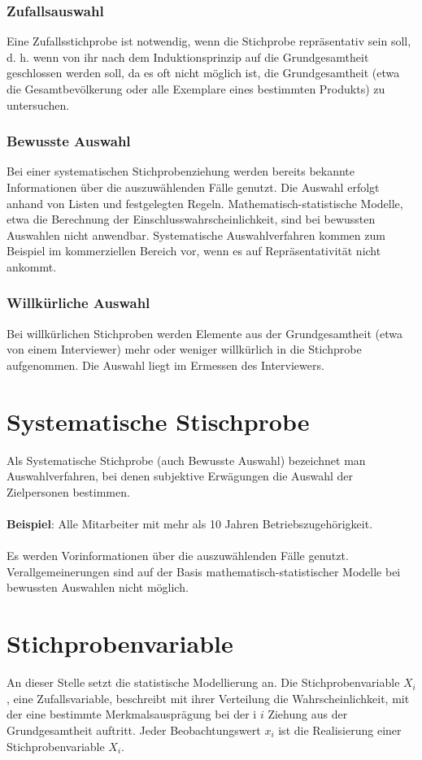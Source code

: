 \subsubsection{Zufallsauswahl}
Eine Zufallsstichprobe ist notwendig, wenn die Stichprobe repräsentativ sein soll, d. h. wenn von ihr nach dem Induktionsprinzip auf die Grundgesamtheit geschlossen werden soll, da es oft nicht möglich ist, die Grundgesamtheit (etwa die Gesamtbevölkerung oder alle Exemplare eines bestimmten Produkts) zu untersuchen.
\subsubsection{Bewusste Auswahl}
Bei einer systematischen Stichprobenziehung werden bereits bekannte Informationen über die auszuwählenden Fälle genutzt. Die Auswahl erfolgt anhand von Listen und festgelegten Regeln. Mathematisch-statistische Modelle, etwa die Berechnung der Einschlusswahrscheinlichkeit, sind bei bewussten Auswahlen nicht anwendbar. Systematische Auswahlverfahren kommen zum Beispiel im kommerziellen Bereich vor, wenn es auf Repräsentativität nicht ankommt.
\subsubsection{Willkürliche Auswahl}
Bei willkürlichen Stichproben werden Elemente aus der Grundgesamtheit (etwa von einem Interviewer) mehr oder weniger willkürlich in die Stichprobe aufgenommen. Die Auswahl liegt im Ermessen des Interviewers.

\section{Systematische Stischprobe}
Als Systematische Stichprobe (auch Bewusste Auswahl) bezeichnet man Auswahlverfahren, bei denen subjektive Erwägungen die Auswahl der Zielpersonen bestimmen.\\
\\
\textbf{Beispiel}: Alle Mitarbeiter mit mehr als 10 Jahren Betriebszugehörigkeit.\\
\\
Es werden Vorinformationen über die auszuwählenden Fälle genutzt. Verallgemeinerungen sind auf der Basis mathematisch-statistischer Modelle bei bewussten Auswahlen nicht möglich.

\section{Stichprobenvariable}
An dieser Stelle setzt die statistische Modellierung an. Die Stichprobenvariable ${\displaystyle X_{i}}$, eine Zufallsvariable, beschreibt mit ihrer Verteilung die Wahrscheinlichkeit, mit der eine bestimmte Merkmalsausprägung bei der i ${\displaystyle i}$ Ziehung aus der Grundgesamtheit auftritt. Jeder Beobachtungswert ${\displaystyle x_{i}}$ ist die Realisierung einer Stichprobenvariable ${\displaystyle X_{i}}$.

